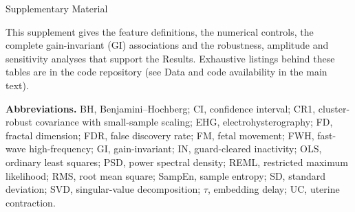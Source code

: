 \documentclass[10pt]{article}
\begin{document}
\begin{center}{\Large Supplementary Material}\par{}\end{center}
This supplement gives the feature definitions, the numerical controls, the complete gain-invariant (GI) associations and the robustness, amplitude and sensitivity analyses that support the Results. Exhaustive listings behind these tables are in the code repository (see Data and code availability in the main text).

\noindent\textbf{Abbreviations.} BH, Benjamini--Hochberg; CI, confidence interval; CR1, cluster-robust covariance with small-sample scaling; EHG, electrohysterography; FD, fractal dimension; FDR, false discovery rate; FM, fetal movement; FWH, fast-wave high-frequency; GI, gain-invariant; IN, guard-cleared inactivity; OLS, ordinary least squares; PSD, power spectral density; REML, restricted maximum likelihood; RMS, root mean square; SampEn, sample entropy; SD, standard deviation; SVD, singular-value decomposition; $\tau$, embedding delay; UC, uterine contraction.
\end{document}
